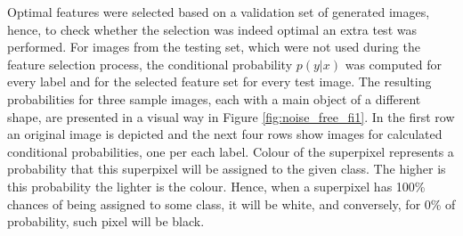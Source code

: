 Optimal features were selected based on a validation set of generated images, hence, to check whether the selection was indeed optimal an extra test was performed. For images from the testing set, which were not used during the feature selection process, the conditional probability $p(y|x)$ was computed for every label and for the selected feature set for every test image. The resulting probabilities for three sample images, each with a main object of a different shape, are presented in a visual way in Figure \ref{fig:noise_free_fi1}. In the first row an original image is depicted and the next four rows show images for calculated conditional probabilities, one per each label. Colour of the superpixel represents a probability that this superpixel will be assigned to the given class. The higher is this probability the lighter is the colour. Hence, when a superpixel has 100\% chances of being assigned to some class, it will be white, and conversely, for 0\% of probability, such pixel will be black. 
